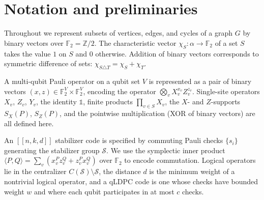 







\chapter{Notation and preliminaries}

\begin{remark}
\label{rem:1_notation_binary_vectors}
\leanok
Throughout we represent subsets of vertices, edges, and cycles of a graph $G$ by binary
vectors over $\mathbb{F}_2 = \mathbb{Z}/2$. The characteristic vector $\chi_S : \alpha \to \mathbb{F}_2$
of a set $S$ takes the value $1$ on $S$ and $0$ otherwise. Addition of binary vectors
corresponds to symmetric difference of sets: $\chi_{S \triangle T} = \chi_S + \chi_T$.
\end{remark}

\begin{remark}
\label{rem:2_notation_pauli_operators}
\leanok
A multi-qubit Pauli operator on a qubit set $V$ is represented as a pair of binary vectors
$(x, z) \in \mathbb{F}_2^V \times \mathbb{F}_2^V$, encoding the operator
$\bigotimes_v X_v^{x_v} Z_v^{z_v}$. Single-site operators $X_v$, $Z_v$, $Y_v$, the identity
$\mathbb{1}$, finite products $\prod_{v \in S} X_v$, the $X$- and $Z$-supports $S_X(P)$,
$S_Z(P)$, and the pointwise multiplication (XOR of binary vectors) are all defined here.
\end{remark}

\begin{remark}
\label{rem:3_notation_stabilizer_codes}
\leanok
An $[[n,k,d]]$ stabilizer code is specified by commuting Pauli checks $\{s_i\}$ generating
the stabilizer group $\mathcal{S}$. We use the symplectic inner product
$\langle P, Q\rangle = \sum_v (x^P_v z^Q_v + z^P_v x^Q_v)$ over $\mathbb{F}_2$ to encode
commutation. Logical operators lie in the centralizer $C(\mathcal{S}) \setminus \mathcal{S}$,
the distance $d$ is the minimum weight of a nontrivial logical operator, and a qLDPC code is
one whose checks have bounded weight $w$ and where each qubit participates in at most $c$ checks.
\end{remark}


